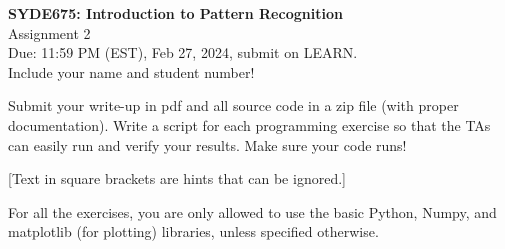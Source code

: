 \documentclass[10pt,letter,notitlepage]{article}
\newcommand{\red}[1]{{\color{red}#1}}
\newcounter{exercise}
\begin{document}
\begin{center}
  \large{\textbf{SYDE675: Introduction to Pattern Recognition} \\ Assignment 2\\ \red{Due: 11:59 PM (EST), Feb 27, 2024}, submit on LEARN.} \\

Include your name and student number!

\end{center}

\begin{center}
Submit your write-up in pdf and all source code in a zip file (with proper documentation). Write a script for each programming exercise so that the TAs can easily run and verify your results. Make sure your code runs!

[Text in square brackets are hints that can be ignored.]
\end{center}

\noindent \red{NOTE} For all the exercises, you are only allowed to use the basic Python, Numpy, and matplotlib (for plotting) libraries, unless specified otherwise.
\end{document}

